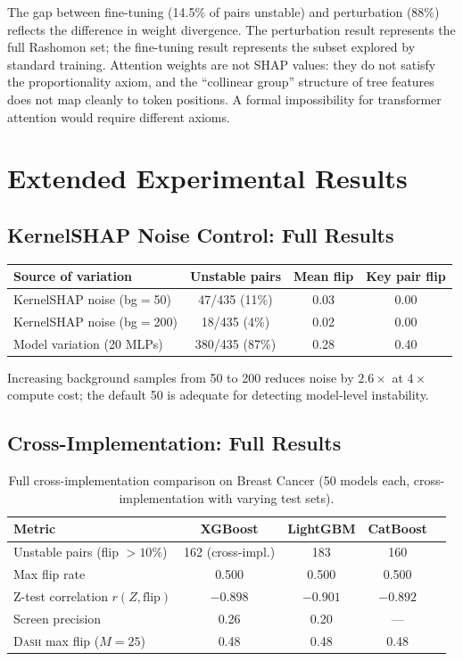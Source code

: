 \documentclass{article}
\newcommand{\DASH}{\textsc{Dash}}
\begin{document}
The gap between fine-tuning (14.5\% of pairs unstable) and perturbation (88\%) reflects the difference in weight divergence. The perturbation result represents the full Rashomon set; the fine-tuning result represents the subset explored by standard training. Attention weights are not SHAP values: they do not satisfy the proportionality axiom, and the ``collinear group'' structure of tree features does not map cleanly to token positions. A formal impossibility for transformer attention would require different axioms.

\section{Extended Experimental Results}

\subsection{KernelSHAP Noise Control: Full Results}

\begin{center}
\small
\begin{tabular}{@{}lccc@{}}
\toprule
Source of variation & Unstable pairs & Mean flip & Key pair flip \\
\midrule
KernelSHAP noise (bg$=$50) & 47/435 (11\%) & 0.03 & 0.00 \\
KernelSHAP noise (bg$=$200) & 18/435 (4\%) & 0.02 & 0.00 \\
Model variation (20 MLPs) & 380/435 (87\%) & 0.28 & 0.40 \\
\bottomrule
\end{tabular}
\end{center}

Increasing background samples from 50 to 200 reduces noise by $2.6\times$ at $4\times$ compute cost; the default 50 is adequate for detecting model-level instability.

\subsection{Cross-Implementation: Full Results}

\begin{table}[t]
\centering
\caption{Full cross-implementation comparison on Breast Cancer (50 models each, cross-implementation with varying test sets).}
\small
\begin{tabular}{@{}lcccc@{}}
\toprule
Metric & XGBoost & LightGBM & CatBoost \\
\midrule
Unstable pairs (flip $> 10\%$) & 162 (cross-impl.) & 183 & 160 \\
Max flip rate & 0.500 & 0.500 & 0.500 \\
Z-test correlation $r(Z, \text{flip})$ & $-0.898$ & $-0.901$ & $-0.892$ \\
Screen precision & 0.26 & 0.20 & --- \\
\DASH{} max flip ($M{=}25$) & 0.48 & 0.48 & 0.48 \\
\bottomrule
\end{tabular}
\end{table}
\end{document}

